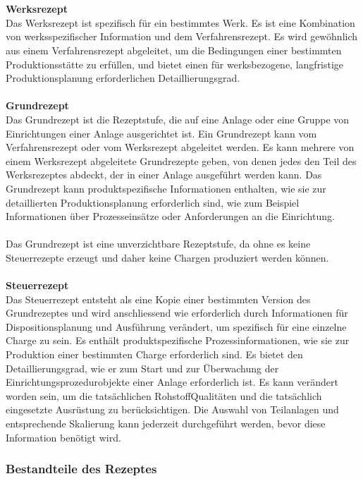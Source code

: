\\\\
\textbf{Werksrezept}\\
Das Werksrezept ist spezifisch für ein bestimmtes Werk. Es ist eine Kombination von werksspezifischer Information und dem Verfahrensrezept. Es wird gewöhnlich aus einem Verfahrensrezept abgeleitet, um die Bedingungen einer bestimmten Produktionsstätte zu erfüllen, und bietet einen für werksbezogene, langfristige Produktionsplanung erforderlichen Detaillierungsgrad.
\\\\
\textbf{Grundrezept}\\
Das Grundrezept ist die Rezeptstufe, die auf eine Anlage oder eine Gruppe von Einrichtungen einer Anlage ausgerichtet ist. Ein Grundrezept kann vom Verfahrensrezept oder vom Werksrezept abgeleitet werden. Es kann mehrere von einem Werksrezept abgeleitete Grundrezepte geben, von denen jedes den Teil des Werksrezeptes abdeckt, der in einer Anlage ausgeführt werden kann. Das Grundrezept kann produktspezifische Informationen enthalten, wie sie zur detaillierten Produktionsplanung erforderlich sind, wie zum Beispiel Informationen über Prozesseinsätze oder Anforderungen an die Einrichtung.\\\\
Das Grundrezept ist eine unverzichtbare Rezeptstufe, da ohne es keine Steuerrezepte erzeugt und daher keine Chargen produziert werden können.
\\\\
\textbf{Steuerrezept}\\
Das Steuerrezept entsteht als eine Kopie einer bestimmten Version des Grundrezeptes und wird anschliessend wie erforderlich durch Informationen für Dispositionsplanung und Ausführung verändert, um spezifisch für eine einzelne Charge zu sein. Es enthält produktspezifische Prozessinformationen, wie sie zur Produktion einer bestimmten Charge erforderlich sind. Es bietet den Detaillierungsgrad, wie er zum Start und zur Überwachung der Einrichtungsprozedurobjekte einer Anlage erforderlich ist. Es kann verändert worden sein, um die tatsächlichen RohstoffQualitäten und die tatsächlich eingesetzte Ausrüstung zu berücksichtigen. Die Auswahl von Teilanlagen und entsprechende Skalierung kann jederzeit durchgeführt werden, bevor diese Information benötigt wird.
\subsubsection{Bestandteile des Rezeptes}

